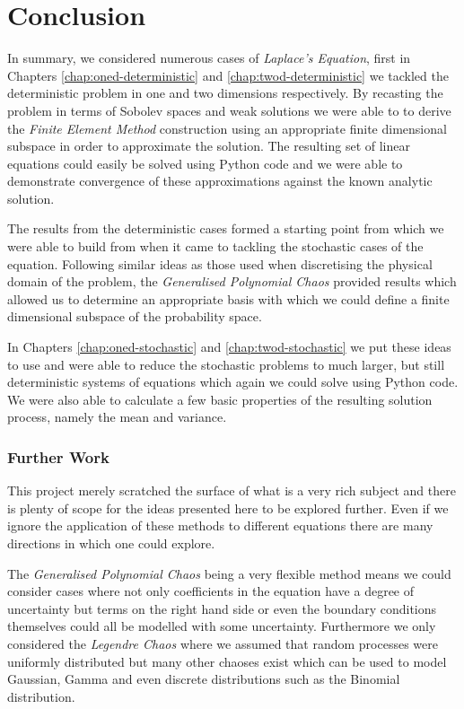 \chapter{Conclusion}\label{chap:conclusion}

In summary, we considered numerous cases of \textit{Laplace's Equation}, first
in Chapters \ref{chap:oned-deterministic} and \ref{chap:twod-deterministic} we
tackled the deterministic problem in one and two dimensions respectively. By
recasting the problem in terms of Sobolev spaces and weak solutions we were
able to to derive the \textit{Finite Element Method} construction using an
appropriate finite dimensional subspace in order to approximate the solution.
The resulting set of linear equations could easily be solved using Python code
and we were able to demonstrate convergence of these approximations against the
known analytic solution.

The results from the deterministic cases formed a starting point from which we
were able to build from when it came to tackling the stochastic cases of the
equation. Following similar ideas as those used when discretising the physical
domain of the problem, the \textit{Generalised Polynomial Chaos} provided
results which allowed us to determine an appropriate basis with which we could
define a finite dimensional subspace of the probability space.

In Chapters \ref{chap:oned-stochastic} and \ref{chap:twod-stochastic} we put
these ideas to use and were able to reduce the stochastic problems to much
larger, but still deterministic systems of equations which again we could solve
using Python code. We were also able to calculate a few basic properties of the
resulting solution process, namely the mean and variance.

\subsection*{Further Work}

This project merely scratched the surface of what is a very rich subject and
there is plenty of scope for the ideas presented here to be explored further.
Even if we ignore the application of these methods to different equations there
are many directions in which one could explore.

The \textit{Generalised Polynomial Chaos} being a very flexible method means we
could consider cases where not only coefficients in the equation have a degree
of uncertainty but terms on the right hand side or even the boundary conditions
themselves could all be modelled with some uncertainty. Furthermore we only
considered the \textit{Legendre Chaos} where we assumed that random processes
were uniformly distributed but many other chaoses exist which can be used to
model Gaussian, Gamma and even discrete distributions such as the Binomial
distribution.

